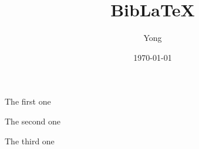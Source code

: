 \documentclass{article}
\title{BibLaTeX}
\author{Yong}
\date{\today}
\begin{document}
	\maketitle
	
	The first one\cite{Yu2016SeqGAN}
	
	The second one\parencite{feifei2007learning}
	
	The third one\supercite{fedus2018maskgan}
	
	\printbibliography
	
	
\end{document}
